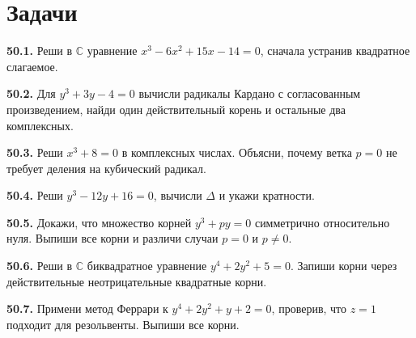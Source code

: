 \section*{Задачи}
\begingroup\setlength{\parskip}{2pt}
\noindent\begin{minipage}[t]{\linewidth}\textbf{50.1.} Реши в \(\mathbb C\) уравнение \(x^3-6x^2+15x-14=0\), сначала устранив квадратное слагаемое.\par\end{minipage}\par
\noindent\begin{minipage}[t]{\linewidth}\textbf{50.2.} Для \(y^3+3y-4=0\) вычисли радикалы Кардано с согласованным произведением, найди один действительный корень и остальные два комплексных.\par\end{minipage}\par
\noindent\begin{minipage}[t]{\linewidth}\textbf{50.3.} Реши \(x^3+8=0\) в комплексных числах. Объясни, почему ветка \(p=0\) не требует деления на кубический радикал.\par\end{minipage}\par
\noindent\begin{minipage}[t]{\linewidth}\textbf{50.4.} Реши \(y^3-12y+16=0\), вычисли \(\Delta\) и укажи кратности.\par\end{minipage}\par
\noindent\begin{minipage}[t]{\linewidth}\textbf{50.5.} Докажи, что множество корней \(y^3+py=0\) симметрично относительно нуля. Выпиши все корни и различи случаи \(p=0\) и \(p\ne0\).\par\end{minipage}\par
\noindent\begin{minipage}[t]{\linewidth}\textbf{50.6.}\starmark{} Реши в \(\mathbb C\) биквадратное уравнение \(y^4+2y^2+5=0\). Запиши корни через действительные неотрицательные квадратные корни.\par\end{minipage}\par
\noindent\begin{minipage}[t]{\linewidth}\textbf{50.7.} Примени метод Феррари к \(y^4+2y^2+y+2=0\), проверив, что \(z=1\) подходит для резольвенты. Выпиши все корни.\par\end{minipage}\par

